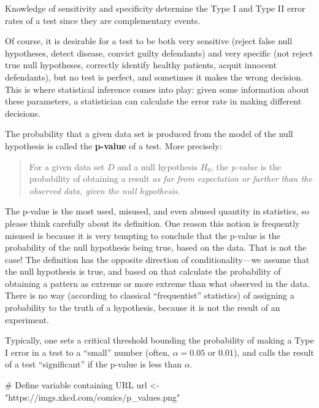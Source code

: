 \documentclass[
  letterpaper,
  DIV=11,
  numbers=noendperiod]{scrreprt}
\newenvironment{Shaded}{\begin{snugshade}}{\end{snugshade}}
\newcommand{\NormalTok}[1]{\textcolor[rgb]{0.00,0.23,0.31}{#1}}
\begin{document}
Knowledge of sensitivity and specificity determine the Type I and Type
II error rates of a test since they are complementary events.

Of course, it is desirable for a test to be both very sensitive (reject
false null hypotheses, detect disease, convict guilty defendants) and
very specific (not reject true null hypotheses, correctly identify
healthy patients, acquit innocent defendants), but no test is perfect,
and sometimes it makes the wrong decision. This is where statistical
inference comes into play: given some information about these
parameters, a statistician can calculate the error rate in making
different decisions.

The probability that a given data set is produced from the model of the
null hypothesis is called the \textbf{p-value} of a test. More
precisely:

\begin{quote}
For a given data set \(D\) and a null hypothesis \(H_0\), the
\emph{p-value} is the probability of obtaining a result \emph{as far
from expectation or farther than the observed data, given the null
hypothesis.}
\end{quote}

The p-value is the most used, misused, and even abused quantity in
statistics, so please think carefully about its definition. One reason
this notion is frequently misused is because it is very tempting to
conclude that the p-value is the probability of the null hypothesis
being true, based on the data. That is not the case! The definition has
the opposite direction of conditionality---we assume that the null
hypothesis is true, and based on that calculate the probability of
obtaining a pattern as extreme or more extreme than what observed in the
data. There is no way (according to classical ``frequentist''
statistics) of assigning a probability to the truth of a hypothesis,
because it is not the result of an experiment.

Typically, one sets a critical threshold bounding the probability of
making a Type I error in a test to a ``small'' number (often,
\(\alpha = 0.05\) or \(0.01\)), and calls the result of a test
``significant'' if the p-value is less than \(\alpha\).

\begin{Shaded}
\begin{Highlighting}[]
\NormalTok{\# Define variable containing URL}
\NormalTok{url \textless{}{-} "https://imgs.xkcd.com/comics/p\_values.png"}
\end{Highlighting}
\end{Shaded}
\end{document}
